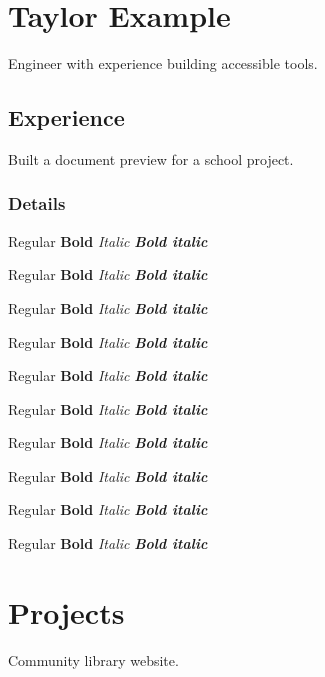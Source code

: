 \documentclass{article}
\begin{document}
\section*{Taylor Example}
Engineer with experience building accessible tools.
\subsection*{Experience}
Built a document preview for a school project.
\subsubsection*{Details}
\newcommand{\samplefonts}{Regular \textbf{Bold} \textit{Italic} \textbf{\textit{Bold italic}}}
{\tiny\samplefonts\par}
{\scriptsize\samplefonts\par}
{\footnotesize\samplefonts\par}
{\small\samplefonts\par}
{\normalsize\samplefonts\par}
{\large\samplefonts\par}
{\Large\samplefonts\par}
{\LARGE\samplefonts\par}
{\huge\samplefonts\par}
{\Huge\samplefonts\par}
\newpage
\section*{Projects}
Community library website.
\end{document}
